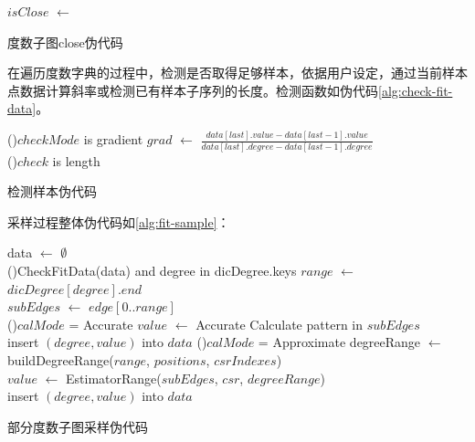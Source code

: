 \documentclass[master]{thesis-uestc}
\begin{document}
\begin{algorithm}[H]
    $isClose$ $\leftarrow$ 
    \caption{度数子图close伪代码}
    \label{alg:close-range}
\end{algorithm}

    在遍历度数字典的过程中，检测是否取得足够样本，依据用户设定，通过当前样本点数据计算斜率或检测已有样本子序列的长度。检测函数如伪代码\ref{alg:check-fit-data}。

\begin{algorithm}[H]
    
    \uIf(){$checkMode$ is gradient}{
        $grad$ $\leftarrow$ $\frac{data[last].value - data[last-1].value}{data[last].degree - data[last-1].degree}$\\
    }
    \ElseIf(){$check$ is length}{
    }
    \caption{检测样本伪代码}
    \label{alg:check-fit-data}
\end{algorithm}

    采样过程整体伪代码如\ref{alg:fit-sample}：

\begin{algorithm}
    data $\leftarrow$ $\emptyset$\\
    \For(){CheckFitData(data) and degree in dicDegree.keys}{
        $range$ $\leftarrow$ $dicDegree[degree].end$\\
        $subEdges$ $\leftarrow$ $edge[0..range]$\\
        \uIf(){$calMode$ = Accurate}{
            $value$ $\leftarrow$ Accurate Calculate pattern in $subEdges$\\
            insert $(degree, value)$ into $data$
        }
        \ElseIf(){$calMode$ = Approximate}{
            degreeRange $\leftarrow$ buildDegreeRange($range$, $positions$, $csrIndexes$)\\
            $value$ $\leftarrow$ EstimatorRange($subEdges$, $csr$, $degreeRange$)\\
            insert $(degree, value)$ into $data$\\
        }
    }
    \caption{部分度数子图采样伪代码}
    \label{alg:fit-sample}
\end{algorithm}   
\end{document}
